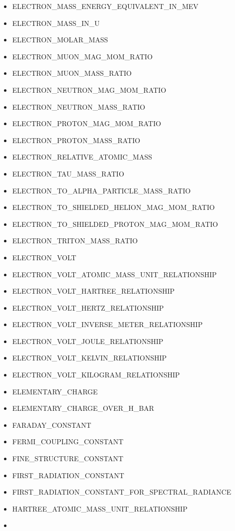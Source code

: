 \begin{itemize}
  ELECTRON\_MASS\_ENERGY\_EQUIVALENT
\item
  ELECTRON\_MASS\_ENERGY\_EQUIVALENT\_IN\_MEV
\item
  ELECTRON\_MASS\_IN\_U
\item
  ELECTRON\_MOLAR\_MASS
\item
  ELECTRON\_MUON\_MAG\_MOM\_RATIO
\item
  ELECTRON\_MUON\_MASS\_RATIO
\item
  ELECTRON\_NEUTRON\_MAG\_MOM\_RATIO
\item
  ELECTRON\_NEUTRON\_MASS\_RATIO
\item
  ELECTRON\_PROTON\_MAG\_MOM\_RATIO
\item
  ELECTRON\_PROTON\_MASS\_RATIO
\item
  ELECTRON\_RELATIVE\_ATOMIC\_MASS
\item
  ELECTRON\_TAU\_MASS\_RATIO
\item
  ELECTRON\_TO\_ALPHA\_PARTICLE\_MASS\_RATIO
\item
  ELECTRON\_TO\_SHIELDED\_HELION\_MAG\_MOM\_RATIO
\item
  ELECTRON\_TO\_SHIELDED\_PROTON\_MAG\_MOM\_RATIO
\item
  ELECTRON\_TRITON\_MASS\_RATIO
\item
  ELECTRON\_VOLT
\item
  ELECTRON\_VOLT\_ATOMIC\_MASS\_UNIT\_RELATIONSHIP
\item
  ELECTRON\_VOLT\_HARTREE\_RELATIONSHIP
\item
  ELECTRON\_VOLT\_HERTZ\_RELATIONSHIP
\item
  ELECTRON\_VOLT\_INVERSE\_METER\_RELATIONSHIP
\item
  ELECTRON\_VOLT\_JOULE\_RELATIONSHIP
\item
  ELECTRON\_VOLT\_KELVIN\_RELATIONSHIP
\item
  ELECTRON\_VOLT\_KILOGRAM\_RELATIONSHIP
\item
  ELEMENTARY\_CHARGE
\item
  ELEMENTARY\_CHARGE\_OVER\_H\_BAR
\item
  FARADAY\_CONSTANT
\item
  FERMI\_COUPLING\_CONSTANT
\item
  FINE\_STRUCTURE\_CONSTANT
\item
  FIRST\_RADIATION\_CONSTANT
\item
  FIRST\_RADIATION\_CONSTANT\_FOR\_SPECTRAL\_RADIANCE
\item
  HARTREE\_ATOMIC\_MASS\_UNIT\_RELATIONSHIP
\item

\end{itemize}
